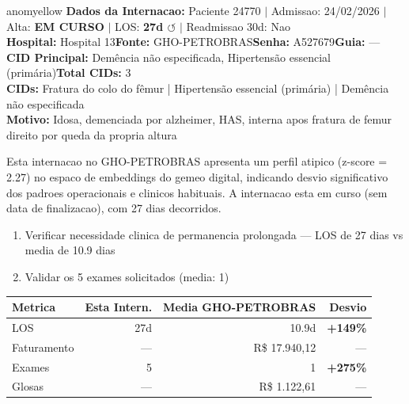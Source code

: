 \documentclass[a4paper,10pt]{article}
\begin{document}
\begin{anomalycard}[Internacao 166618 | GHO-PETROBRAS | MODERADO (z=2.27)]{anomyellow}
\textbf{Dados da Internacao:} Paciente 24770 $\mid$ Admissao: 24/02/2026 $\mid$ Alta: \textcolor{anomorange}{\textbf{EM CURSO}} $\mid$ LOS: \textbf{27d \textcolor{anomorange}{$\circlearrowleft$}} $\mid$ Readmissao 30d: Nao\\
\textbf{Hospital:} Hospital 13\quad\textbf{Fonte:} GHO-PETROBRAS\quad\textbf{Senha:} A527679\quad\textbf{Guia:} ---\\
\textbf{CID Principal:} {\small Demência não especificada, Hipertensão essencial (primária)}\quad\textbf{Total CIDs:} 3\\

\textbf{CIDs:} {\scriptsize Fratura do colo do fêmur | Hipertensão essencial (primária) | Demência não especificada}\\

\textbf{Motivo:} {\scriptsize Idosa, demenciada por alzheimer, HAS, interna apos fratura de femur direito por queda da propria altura}\\

\vspace{2pt}\begin{tcolorbox}[colback=severityred!20,colframe=anomyellow,title={\textbf{Interpretacao de Negocio}},fonttitle=\bfseries\small,left=4pt,right=4pt,top=3pt,bottom=3pt]
{\small Esta internacao no GHO-PETROBRAS apresenta um perfil atipico (z-score = 2.27) no espaco de embeddings do gemeo digital, indicando desvio significativo dos padroes operacionais e clinicos habituais. A internacao esta em curso (sem data de finalizacao), com 27 dias decorridos.}
\end{tcolorbox}
\begin{tcolorbox}[colback=severityyellow!30,colframe=anomorange,title={\textbf{Recomendacoes Especificas}},fonttitle=\bfseries\small,left=4pt,right=4pt,top=3pt,bottom=3pt]
\begin{enumerate}[nosep,leftmargin=16pt]
\item {\small Verificar necessidade clinica de permanencia prolongada --- LOS de 27 dias vs media de 10.9 dias}
\item {\small Validar os 5 exames solicitados (media: 1)}
\end{enumerate}
\end{tcolorbox}
\begin{center}\begin{tabular}{l r r r}\toprule\textbf{Metrica} & \textbf{Esta Intern.} & \textbf{Media GHO-PETROBRAS} & \textbf{Desvio} \\\midrule
LOS & 27d & 10.9d & \textcolor{anomred}{\textbf{+149\%}} \\
Faturamento & --- & R\$ 17.940,12 & --- \\
Exames & 5 & 1 & \textcolor{anomred}{\textbf{+275\%}} \\
Glosas & --- & R\$ 1.122,61 & --- \\
\bottomrule\end{tabular}\end{center}


\end{anomalycard}
\end{document}
